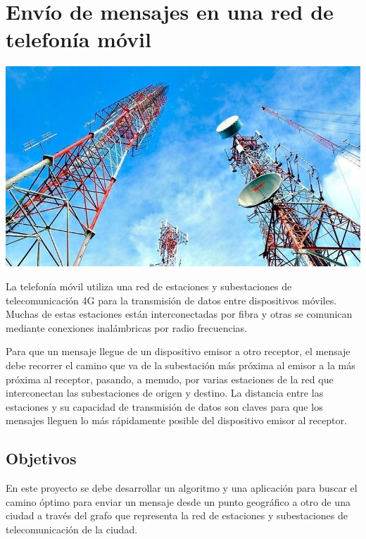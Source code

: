 \documentclass[
  a4paper,
]{scrreport}
\begin{document}

\hypertarget{envuxedo-de-mensajes-en-una-red-de-telefonuxeda-muxf3vil}{%
\chapter{Envío de mensajes en una red de telefonía
móvil}\label{envuxedo-de-mensajes-en-una-red-de-telefonuxeda-muxf3vil}}

\includegraphics{./img/telefonia-movil/antenas.jpg}

La telefonía móvil utiliza una red de estaciones y subestaciones de
telecomunicación 4G para la transmisión de datos entre dispositivos
móviles. Muchas de estas estaciones están interconectadas por fibra y
otras se comunican mediante conexiones inalámbricas por radio
frecuencias.

Para que un mensaje llegue de un dispositivo emisor a otro receptor, el
mensaje debe recorrer el camino que va de la subestación más próxima al
emisor a la más próxima al receptor, pasando, a menudo, por varias
estaciones de la red que interconectan las subestaciones de origen y
destino. La distancia entre las estaciones y su capacidad de transmisión
de datos son claves para que los mensajes lleguen lo más rápidamente
posible del dispositivo emisor al receptor.

\hypertarget{objetivos-1}{%
\section{Objetivos}\label{objetivos-1}}

En este proyecto se debe desarrollar un algoritmo y una aplicación para
buscar el camino óptimo para enviar un mensaje desde un punto geográfico
a otro de una ciudad a través del grafo que representa la red de
estaciones y subestaciones de telecomunicación de la ciudad.
\end{document}
